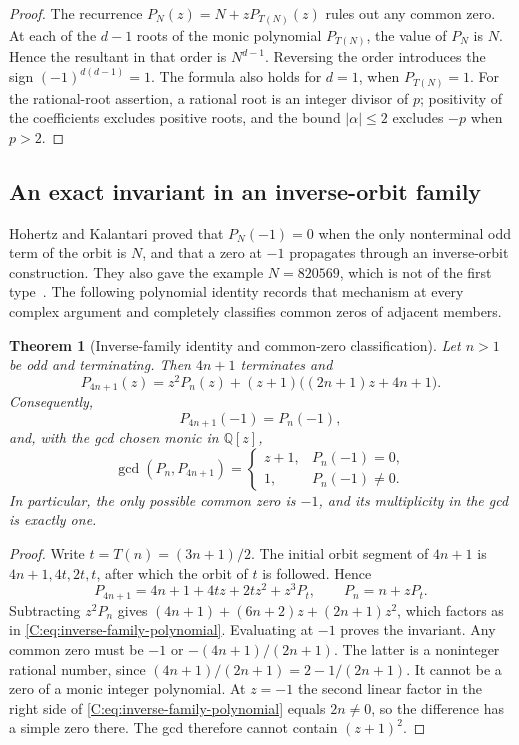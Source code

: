 \documentclass[11pt,a4paper]{article}
\newtheorem{theorem}{Theorem}[section]
\theoremstyle{definition}
\theoremstyle{remark}
\numberwithin{equation}{section}
\begin{document}
\begin{proof}
The recurrence $P_N(z)=N+zP_{T(N)}(z)$ rules out any common zero.
At each of the $d-1$ roots of the monic polynomial $P_{T(N)}$, the value
of $P_N$ is $N$. Hence the resultant in that order is $N^{d-1}$.
Reversing the order introduces the sign $(-1)^{d(d-1)}=1$.
The formula also holds for $d=1$, when $P_{T(N)}=1$.
For the rational-root assertion, a rational root is an integer divisor
of $p$; positivity of the coefficients excludes positive roots, and
the bound $|\alpha|\leq2$ excludes $-p$ when $p>2$.
\end{proof}

\subsection{An exact invariant in an inverse-orbit family}

Hohertz and Kalantari proved that $P_N(-1)=0$ when the only nonterminal
odd term of the orbit is $N$, and that a zero at $-1$ propagates through
an inverse-orbit construction. They also gave the example $N=820569$,
which is not of the first type~\cite[Theorem~7 and Lemma~11]{R025}.
The following polynomial identity records that mechanism at every complex
argument and completely classifies common zeros of adjacent members.

\begin{theorem}[Inverse-family identity and common-zero classification]
\label{C:thm:inverse-common-zero}
Let $n>1$ be odd and terminating. Then $4n+1$ terminates and
\begin{equation}
\label{C:eq:inverse-family-polynomial}
 P_{4n+1}(z)
 =z^2P_n(z)+(z+1)\bigl((2n+1)z+4n+1\bigr).
\end{equation}
Consequently,
\[
 P_{4n+1}(-1)=P_n(-1),
\]
and, with the gcd chosen monic in $\mathbb Q[z]$,
\[
 \gcd(P_n,P_{4n+1})=
 \begin{cases}
 z+1,&P_n(-1)=0,\\
 1,&P_n(-1)\ne0.
 \end{cases}
\]
In particular, the only possible common zero is $-1$, and its multiplicity
in the gcd is exactly one.
\end{theorem}

\begin{proof}
Write $t=T(n)=(3n+1)/2$. The initial orbit segment of $4n+1$ is
$4n+1,4t,2t,t$, after which the orbit of $t$ is followed. Hence
\[
 P_{4n+1}=4n+1+4tz+2tz^2+z^3P_t,
 \qquad P_n=n+zP_t.
\]
Subtracting $z^2P_n$ gives
$(4n+1)+(6n+2)z+(2n+1)z^2$, which factors as in
\eqref{C:eq:inverse-family-polynomial}. Evaluating at $-1$ proves the invariant.
Any common zero must be $-1$ or $-(4n+1)/(2n+1)$.
The latter is a noninteger rational number, since
$(4n+1)/(2n+1)=2-1/(2n+1)$. It cannot be a zero of a monic integer
polynomial. At $z=-1$ the second linear factor in the right side of
\eqref{C:eq:inverse-family-polynomial} equals $2n\ne0$, so the difference
has a simple zero there. The gcd therefore cannot contain $(z+1)^2$.
\end{proof}
\end{document}
